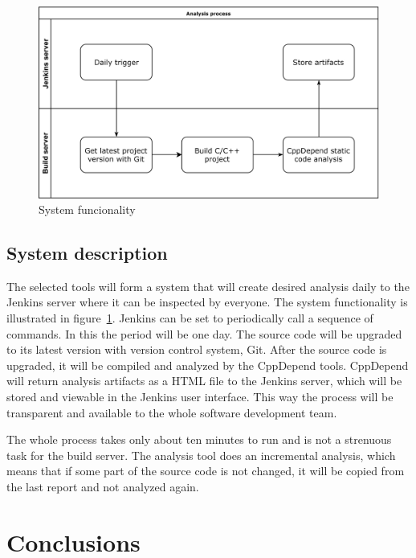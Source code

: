 \begin{figure}[t!]
\centering
\includegraphics[scale=0.06]{systemdesc.png}
\caption{System funcionality}
\label{fig:systemdesc}
\end{figure}

\section{System description}

The selected tools will form a system that will create desired analysis daily to the Jenkins server where it can be inspected by everyone. The system functionality is illustrated in figure~\ref{fig:systemdesc}. Jenkins can be set to periodically call a sequence of commands. In this the period will be one day. The source code will be upgraded to its latest version with version control system, Git. After the source code is upgraded, it will be compiled and analyzed by the CppDepend tools. CppDepend will return analysis artifacts as a HTML file to the Jenkins server, which will be stored and viewable in the Jenkins user interface.
This way the process will be transparent and available to the whole software development team.

The whole process takes only about ten minutes to run and is not a strenuous task for the build server. The analysis tool does an incremental analysis, which means that if some part of the source code is not changed, it will be copied from the last report and not analyzed again.





\chapter{Conclusions}

